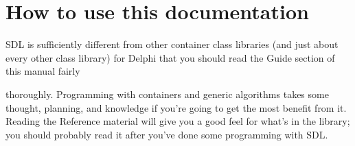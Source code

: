 \documentclass{report}
\begin{document}
%
%
%
%
%
%
%
%
%
%
%
%
%

\chapter{How to use this documentation}

SDL is sufficiently different from other container class 
libraries (and just about every other
class library) for Delphi that you should read the 
Guide
section of this manual fairly

thoroughly. Programming with containers and generic algorithms takes some
thought, planning, and knowledge if you're going to get the most benefit
from it. Reading the Reference material will give you a good feel for what's
in the library; you should probably read it after you've done some
programming with SDL.
\end{document}
